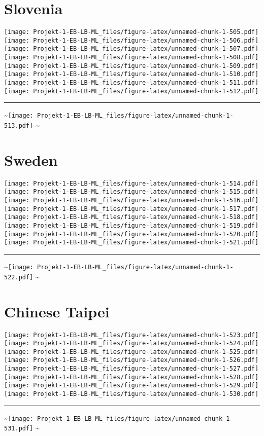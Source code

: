 \documentclass[]{article}
\begin{document}
\section{Slovenia}\label{slovenia}

\texttt{[image: Projekt-1-EB-LB-ML\_files/figure-latex/unnamed-chunk-1-505.pdf]}
\texttt{[image: Projekt-1-EB-LB-ML\_files/figure-latex/unnamed-chunk-1-506.pdf]}
\texttt{[image: Projekt-1-EB-LB-ML\_files/figure-latex/unnamed-chunk-1-507.pdf]}
\texttt{[image: Projekt-1-EB-LB-ML\_files/figure-latex/unnamed-chunk-1-508.pdf]}
\texttt{[image: Projekt-1-EB-LB-ML\_files/figure-latex/unnamed-chunk-1-509.pdf]}
\texttt{[image: Projekt-1-EB-LB-ML\_files/figure-latex/unnamed-chunk-1-510.pdf]}
\texttt{[image: Projekt-1-EB-LB-ML\_files/figure-latex/unnamed-chunk-1-511.pdf]}
\texttt{[image: Projekt-1-EB-LB-ML\_files/figure-latex/unnamed-chunk-1-512.pdf]}
\bigskip\hrule\bigskip
\textasciitilde{}\hfill\texttt{[image: Projekt-1-EB-LB-ML\_files/figure-latex/unnamed-chunk-1-513.pdf]}
\hfill \textasciitilde{} \vfill\eject

\section{Sweden}\label{sweden}

\texttt{[image: Projekt-1-EB-LB-ML\_files/figure-latex/unnamed-chunk-1-514.pdf]}
\texttt{[image: Projekt-1-EB-LB-ML\_files/figure-latex/unnamed-chunk-1-515.pdf]}
\texttt{[image: Projekt-1-EB-LB-ML\_files/figure-latex/unnamed-chunk-1-516.pdf]}
\texttt{[image: Projekt-1-EB-LB-ML\_files/figure-latex/unnamed-chunk-1-517.pdf]}
\texttt{[image: Projekt-1-EB-LB-ML\_files/figure-latex/unnamed-chunk-1-518.pdf]}
\texttt{[image: Projekt-1-EB-LB-ML\_files/figure-latex/unnamed-chunk-1-519.pdf]}
\texttt{[image: Projekt-1-EB-LB-ML\_files/figure-latex/unnamed-chunk-1-520.pdf]}
\texttt{[image: Projekt-1-EB-LB-ML\_files/figure-latex/unnamed-chunk-1-521.pdf]}
\bigskip\hrule\bigskip
\textasciitilde{}\hfill\texttt{[image: Projekt-1-EB-LB-ML\_files/figure-latex/unnamed-chunk-1-522.pdf]}
\hfill \textasciitilde{} \vfill\eject

\section{Chinese Taipei}\label{chinese-taipei}

\texttt{[image: Projekt-1-EB-LB-ML\_files/figure-latex/unnamed-chunk-1-523.pdf]}
\texttt{[image: Projekt-1-EB-LB-ML\_files/figure-latex/unnamed-chunk-1-524.pdf]}
\texttt{[image: Projekt-1-EB-LB-ML\_files/figure-latex/unnamed-chunk-1-525.pdf]}
\texttt{[image: Projekt-1-EB-LB-ML\_files/figure-latex/unnamed-chunk-1-526.pdf]}
\texttt{[image: Projekt-1-EB-LB-ML\_files/figure-latex/unnamed-chunk-1-527.pdf]}
\texttt{[image: Projekt-1-EB-LB-ML\_files/figure-latex/unnamed-chunk-1-528.pdf]}
\texttt{[image: Projekt-1-EB-LB-ML\_files/figure-latex/unnamed-chunk-1-529.pdf]}
\texttt{[image: Projekt-1-EB-LB-ML\_files/figure-latex/unnamed-chunk-1-530.pdf]}
\bigskip\hrule\bigskip
\textasciitilde{}\hfill\texttt{[image: Projekt-1-EB-LB-ML\_files/figure-latex/unnamed-chunk-1-531.pdf]}
\hfill \textasciitilde{} \vfill\eject
\end{document}
